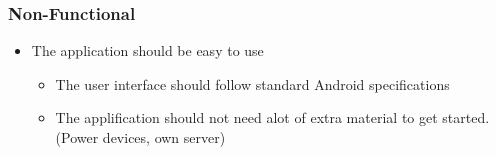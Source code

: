 \subsubsection{Non-Functional}

\begin{itemize}
\item The application should be easy to use
\begin{itemize}
\item The user interface should follow standard Android specifications 
\item The applification should not need alot of extra material to get started. (Power devices, own server)
\end{itemize}
\end{itemize}


